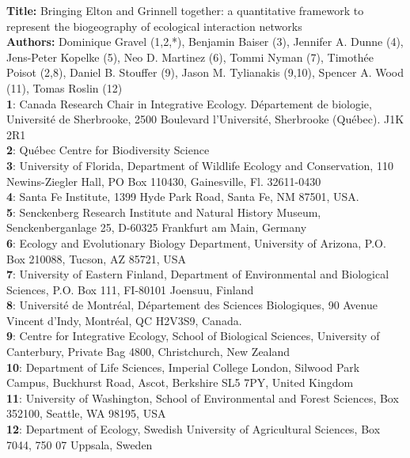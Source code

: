 \documentclass[12pt]{article}
\begin{document}
\linenumbers
\modulolinenumbers[1]

\textbf{Title:} Bringing Elton and Grinnell together: a quantitative framework
to represent the biogeography of ecological interaction networks\\

\textbf{Authors:} Dominique Gravel (1,2,*), Benjamin Baiser (3), Jennifer
A. Dunne (4), Jens-Peter Kopelke (5), Neo D. Martinez (6), Tommi
Nyman (7), Timothée Poisot (2,8), Daniel B.
Stouffer (9), Jason M. Tylianakis (9,10), Spencer A. Wood (11), Tomas Roslin (12) \\

\textbf{1}: Canada Research Chair in Integrative Ecology. Département de
biologie, Université de Sherbrooke, 2500 Boulevard l'Université,
Sherbrooke (Québec). J1K 2R1\\
\textbf{2}: Québec Centre for Biodiversity Science\\
\textbf{3}: University of Florida, Department of Wildlife Ecology and Conservation, 110 Newins-Ziegler Hall, PO Box 110430, Gainesville, Fl. 32611-0430 \\
\textbf{4}: Santa Fe Institute, 1399 Hyde Park Road, Santa Fe, NM 87501, USA.\\
\textbf{5}: Senckenberg Research Institute and Natural History Museum, Senckenberganlage 25, D-60325 Frankfurt am Main, Germany\\
\textbf{6}: Ecology and Evolutionary Biology Department, University of Arizona, P.O. Box 210088, Tucson, AZ 85721, USA\\
\textbf{7}: University of Eastern Finland, Department of Environmental and Biological Sciences, P.O. Box 111, FI-80101 Joensuu, Finland\\
\textbf{8}: Université de Montréal, Département des Sciences Biologiques, 90 Avenue Vincent d’Indy, Montréal, QC H2V3S9, Canada.\\
\textbf{9}: Centre for Integrative Ecology, School of Biological Sciences, University of Canterbury, Private Bag 4800, Christchurch, New Zealand\\
\textbf{10}: Department of Life Sciences, Imperial College London, Silwood Park Campus, 
Buckhurst Road, Ascot, Berkshire SL5 7PY, United Kingdom\\
\textbf{11}: University of Washington, School of Environmental and Forest Sciences,
Box 352100, Seattle, WA 98195, USA\\
\textbf{12}: Department of Ecology, Swedish University of Agricultural Sciences, Box 7044, 750 07 Uppsala, Sweden\\
\end{document}
